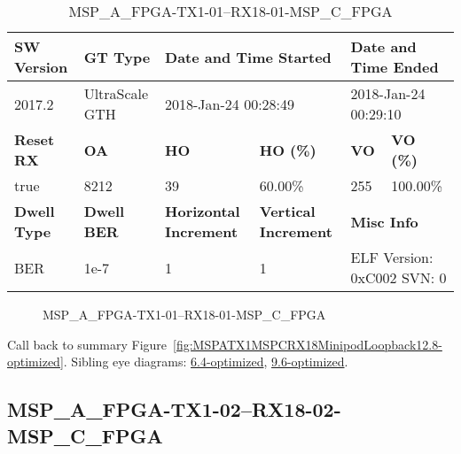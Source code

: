 \begin{table}[h]
\centering
\caption{MSP\_A\_FPGA-TX1-01--RX18-01-MSP\_C\_FPGA}
\label{tab:MSPAFPGATX101RX1801MSPCFPGA12.8-optimized}
\begin{tabular}{@{}|l|l|l|l|l|l|@{}}
\toprule
\textbf{SW Version}                & \textbf{GT Type}   & \multicolumn{2}{l|}{\textbf{Date and Time Started}}            & \multicolumn{2}{l|}{\textbf{Date and Time Ended}}        \\ \midrule
2017.2                       & UltraScale GTH          & \multicolumn{2}{l|}{2018-Jan-24 00:28:49}                   & \multicolumn{2}{l|}{2018-Jan-24 00:29:10}               \\ \midrule
\textbf{Reset RX}                  & \textbf{OA} & \textbf{HO}   & \textbf{HO (\%)} & \textbf{VO} & \textbf{VO (\%)} \\ \midrule
true & 8212        & 39          & 60.00\%        & 255        & 100.00\%       \\ \midrule
\textbf{Dwell Type}                & \textbf{Dwell BER} & \textbf{Horizontal Increment} & \textbf{Vertical Increment}    & \multicolumn{2}{l|}{\textbf{Misc Info}}                  \\ \midrule
BER                            & 1e-7        & 1        & 1           & \multicolumn{2}{l|}{ELF Version: 0xC002 SVN: 0}                         \\ \bottomrule
\end{tabular}
\end{table}

\begin{figure}[h]
\caption{MSP\_A\_FPGA-TX1-01--RX18-01-MSP\_C\_FPGA} \label{fig:MSPAFPGATX101RX1801MSPCFPGA12.8-optimized}
\end{figure}

Call back to summary Figure~\ref{fig:MSPATX1MSPCRX18MinipodLoopback12.8-optimized}.
Sibling eye diagrams: \hyperref[sec:MSPAFPGATX101RX1801MSPCFPGA6.4-optimized]{6.4-optimized}, \hyperref[sec:MSPAFPGATX101RX1801MSPCFPGA9.6-optimized]{9.6-optimized}.

\clearpage
\newpage


\subsection{MSP\_A\_FPGA-TX1-02--RX18-02-MSP\_C\_FPGA}\label{sec:MSPAFPGATX102RX1802MSPCFPGA12.8-optimized}

